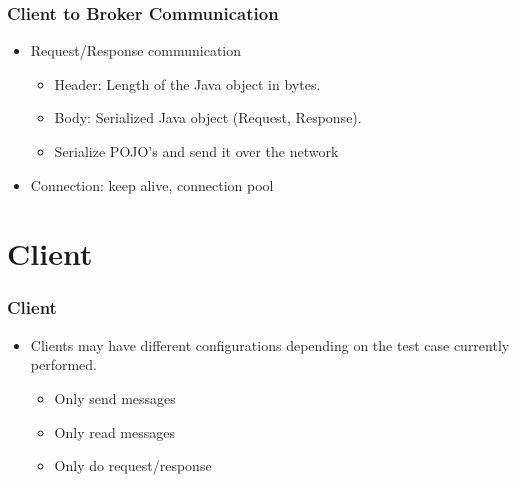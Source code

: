 \documentclass{beamer}
\begin{document}

\begin{frame}
\frametitle{Client to Broker Communication}

\begin{itemize}
\item Request/Response communication
\begin{itemize}
\item Header: Length of the Java object in bytes.
\item Body: Serialized Java object (Request, Response).
\item Serialize POJO's and send it over the network
\end{itemize}

\item Connection: keep alive, connection pool

\end{itemize}
\end{frame}


\section{Client}
\begin{frame}
\frametitle{Client}
\begin{itemize}
\item Clients may have different configurations depending on the test case currently performed.
\begin{itemize}
\item{Only send messages}
\item{Only read messages}
\item{Only do request/response}
\end{itemize}
\end{itemize}
\end{frame}



\end{document}
